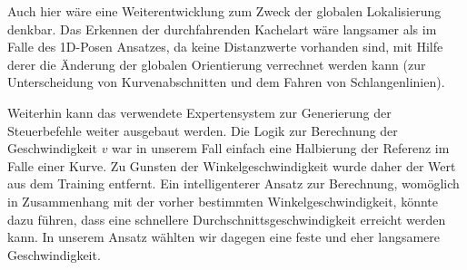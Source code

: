 Auch hier wäre eine Weiterentwicklung zum Zweck der globalen Lokalisierung denkbar. Das Erkennen der durchfahrenden Kachelart wäre langsamer als im Falle des 1D-Posen Ansatzes, da keine Distanzwerte vorhanden sind, mit Hilfe derer die Änderung der globalen Orientierung verrechnet werden kann (zur Unterscheidung von Kurvenabschnitten und dem Fahren von Schlangenlinien).

Weiterhin kann das verwendete Expertensystem zur Generierung der Steuerbefehle weiter ausgebaut werden. Die Logik zur Berechnung der Geschwindigkeit $v$ war in unserem Fall einfach eine Halbierung der Referenz im Falle einer Kurve. Zu Gunsten der Winkelgeschwindigkeit wurde daher der Wert aus dem Training entfernt. Ein intelligenterer Ansatz zur Berechnung, womöglich in Zusammenhang mit der vorher bestimmten Winkelgeschwindigkeit, könnte dazu führen, dass eine schnellere Durchschnittsgeschwindigkeit erreicht werden kann. In unserem Ansatz wählten wir dagegen eine feste und eher langsamere Geschwindigkeit.
